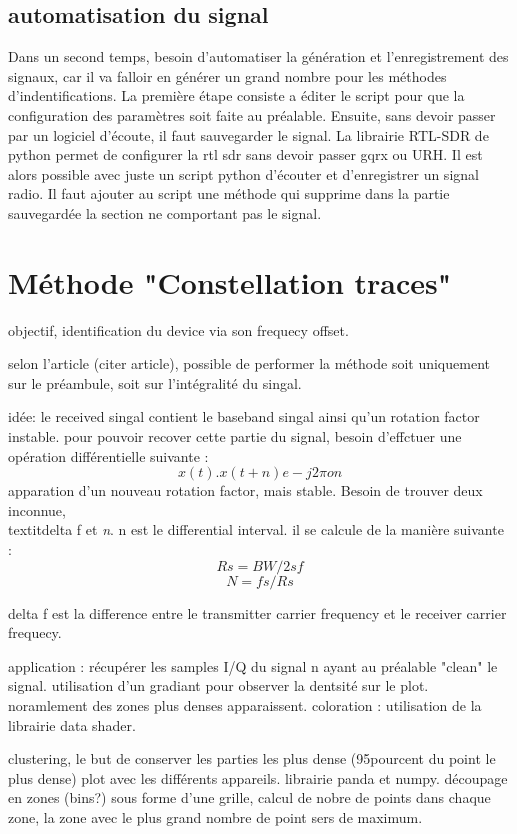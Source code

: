 \subsection{automatisation du signal}

Dans un second temps, besoin d'automatiser la génération et l'enregistrement des signaux, car il va falloir en générer un grand nombre pour les méthodes d'indentifications. La première étape consiste a éditer le script pour que la configuration des paramètres soit faite au préalable. 
Ensuite, sans devoir passer par un logiciel d'écoute, il faut sauvegarder le signal. La librairie RTL-SDR de python permet de configurer la rtl sdr sans devoir passer gqrx ou URH. Il est alors possible avec juste un script python d'écouter et d'enregistrer un signal radio. 
Il faut ajouter au script une méthode qui supprime dans la partie sauvegardée la section ne comportant pas le signal.


\section{Méthode "Constellation traces"}

objectif, identification du device via son frequecy offset.

selon l'article (citer article), possible de performer la méthode soit uniquement sur le  préambule, soit sur l'intégralité du singal. 

idée: le received singal contient le baseband singal ainsi qu'un rotation factor instable. pour pouvoir recover cette partie du signal, besoin d'effctuer une opération différentielle suivante : $$ x(t) . x(t+n) e -j2\pi on $$
apparation d'un nouveau rotation factor, mais stable. Besoin de trouver deux inconnue, \\textit{delta f} et \textit{n}. n est le differential interval. il se calcule de la manière suivante : $$ Rs = BW / 2sf $$ 
$$ N = fs / Rs $$

delta f est la difference entre le transmitter carrier frequency et le receiver carrier frequecy.

application : récupérer les samples I/Q du signal n ayant au préalable "clean" le signal. utilisation d'un gradiant pour observer la dentsité sur le plot. noramlement des zones plus denses apparaissent.
coloration : utilisation de la librairie data shader. 


clustering, le but de conserver les parties les plus dense (95pourcent du point le plus dense) plot avec les différents appareils.
librairie panda et numpy. découpage en zones (bins?) sous forme d'une grille, calcul de nobre de points dans chaque zone, la zone avec le plus grand nombre de point sers de maximum. 
